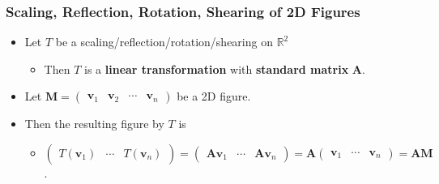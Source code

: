 \documentclass[../ma2001_notes.tex]{subfiles}
\begin{document}
\subsubsection{Scaling, Reflection, Rotation, Shearing of 2D Figures}
\begin{itemize}
	\item Let \(T\) be a scaling/reflection/rotation/shearing on \(\mathbb{R}^2\)
	\begin{itemize}
		\item Then \(T\) is a \textbf{linear transformation} with \textbf{standard matrix} \(\bm{A}\).
	\end{itemize}
	\item Let \(\bm{M}=\begin{pmatrix}
		\bm{v}_1 & \bm{v}_2 & \cdots & \bm{v}_n
	\end{pmatrix}\) be a 2D figure.
	\item Then the resulting figure by \(T\) is
	\begin{itemize}
		\item\(\begin{pmatrix}
			T(\bm{v}_1) & \cdots & T(\bm{v}_n)
		\end{pmatrix}=\begin{pmatrix}
			\bm{Av}_1 & \cdots & \bm{Av}_n
		\end{pmatrix}=\bm{A}\begin{pmatrix}
			\bm{v}_1 & \cdots & \bm{v}_n
		\end{pmatrix}=\bm{AM}\).
	\end{itemize}
\end{itemize}
\end{document}

